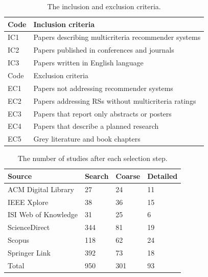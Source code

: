 \begin{table}
\centering
\begin{tabular}{@{}ll@{}}
\toprule
Code & Inclusion criteria \\ \midrule
IC1 & Papers describing multicriteria recommender systems \\
IC2 & Papers published in conferences and journals \\
IC3 & Papers written in English language \\ \midrule
Code & Exclusion criteria \\ \midrule
EC1 & Papers not addressing recommender systems \\
EC2 & Papers addressing RSs without multicriteria ratings \\
EC3 & Papers that report only abstracts or posters \\
EC4 & Papers that describe a planned research \\
EC5 & Grey literature and book chapters \\ \bottomrule
\end{tabular}
\caption[Inclusion and exclusion criteria]{The inclusion and exclusion criteria.}
\label{mcr:tab:criteria}
\end{table}

\begin{table}
\centering
\begin{tabular}{@{}llll@{}}
\toprule
Source               & Search & Coarse & Detailed \\ \midrule
ACM Digital Library  & 27     & 24     & 11       \\
IEEE Xplore          & 38     & 36     & 15       \\
ISI Web of Knowledge & 31     & 25     & 6        \\
ScienceDirect        & 344    & 81     & 19       \\
Scopus               & 118    & 62     & 24       \\
Springer Link        & 392    & 73     & 18       \\ \midrule
Total                & 950    & 301    & 93       \\ \bottomrule
\end{tabular}
\caption[Studies per selection step]{The number of studies after each selection step.}
\label{mcr:tab:numbers}
\end{table}

